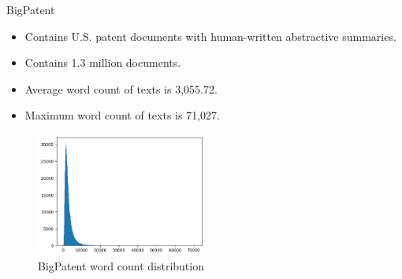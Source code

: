 			\begin{frame}{BigPatent}
				
				\begin{itemize}
					\item Contains U.S. patent documents with human-written abstractive summaries.
					\item Contains 1.3 million documents.
					\item Average word count of texts is 3,055.72.
					\item Maximum word count of texts is 71,027.
				\end{itemize}

				\begin{figure}
					\centering
					\includegraphics[width=0.5\textwidth]{../Report/Images/bigpatent-wordcount.png}
					\caption{BigPatent word count distribution}
				\end{figure}
			
			\end{frame}

